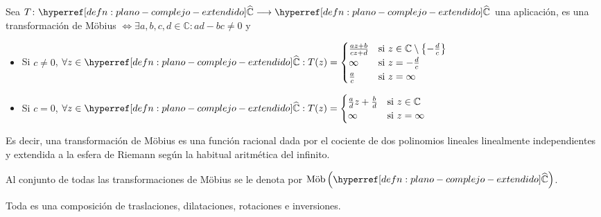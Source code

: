 \begin{defn}\label{defn:transformacion-mobius}
    Sea $T \colon \exhyperref[defn:plano-complejo-extendido]{plano-complejo-extendido}{\widehat{\mathbb{C}}} \longrightarrow \exhyperref[defn:plano-complejo-extendido]{plano-complejo-extendido}{\widehat{\mathbb{C}}}$ una aplicación, es una transformación de Möbius $\iff \exists a, b, c, d \in \mathbb{C} : ad - bc \neq 0$ y
    \begin{itemize}
        \item Si $c \neq 0$, $\ds \forall z \in \exhyperref[defn:plano-complejo-extendido]{plano-complejo-extendido}{\widehat{\C}} : T(z) = \begin{cases}
            \frac{az + b}{cz + d} & \text{si } z \in \C \setminus \left\{-\frac{d}{c}\right\} \\
            \infty & \text{si } z = -\frac{d}{c} \\
            \frac{a}{c} & \text{si } z = \infty
        \end{cases}$
        \item Si $c = 0$, $\ds \forall z \in \exhyperref[defn:plano-complejo-extendido]{plano-complejo-extendido}{\widehat{\C}} : T(z) = \begin{cases}
            \frac{a}{d}z + \frac{b}{d} & \text{si } z \in \C \\
            \infty & \text{si } z = \infty
        \end{cases}$
    \end{itemize}

    Es decir, una transformación de Möbius es una función racional dada por el cociente de dos polinomios lineales linealmente independientes y extendida a la esfera de Riemann según la habitual aritmética del infinito.

    Al conjunto de todas las transformaciones de Möbius se le denota por $\operatorname{M\ddot{o}b}\left(\exhyperref[defn:plano-complejo-extendido]{plano-complejo-extendido}{\widehat{\C}}\right)$.
\end{defn}

\begin{prop}\label{prop:transformacion-mobius-composicion}
    Toda  es una composición de traslaciones, dilataciones, rotaciones e inversiones.
\end{prop}

